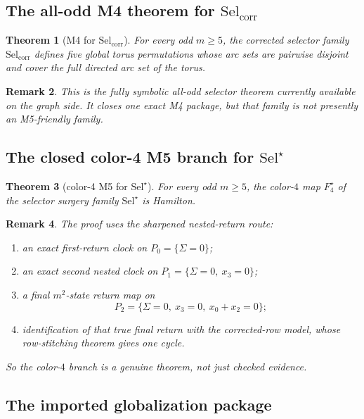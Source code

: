\documentclass[11pt]{article}
\newtheorem{theorem}{Theorem}[section]
\newtheorem{remark}[theorem]{Remark}
\newcommand{\SelCorr}{\mathrm{Sel}_{\mathrm{corr}}}
\newcommand{\SelStar}{\mathrm{Sel}^{\star}}
\begin{document}
\subsection{The all-odd M4 theorem for $\SelCorr$}

\begin{theorem}[M4 for $\SelCorr$]
\label{thm:M4-SelCorr}
For every odd $m\ge 5$, the corrected selector family $\SelCorr$ defines five
global torus permutations whose arc sets are pairwise disjoint and cover the
full directed arc set of the torus.
\end{theorem}

\begin{remark}
This is the fully symbolic all-odd selector theorem currently available on the
graph side. It closes one exact M4 package, but that family is not presently
an M5-friendly family.
\end{remark}

\subsection{The closed color-4 M5 branch for $\SelStar$}

\begin{theorem}[color-4 M5 for $\SelStar$]
\label{thm:M5-color4-SelStar}
For every odd $m\ge 5$, the color-$4$ map $F_4^{\star}$ of the selector surgery
family $\SelStar$ is Hamilton.
\end{theorem}

\begin{remark}
The proof uses the sharpened nested-return route:
\begin{enumerate}[label=\textup{(\arabic*)},leftmargin=2.5em]
\item an exact first-return clock on $P_0=\{\Sigma=0\}$;
\item an exact second nested clock on $P_1=\{\Sigma=0,\ x_3=0\}$;
\item a final $m^2$-state return map on
      \[
      P_2=\{\Sigma=0,\ x_3=0,\ x_0+x_2=0\};
      \]
\item identification of that true final return with the corrected-row model,
      whose row-stitching theorem gives one cycle.
\end{enumerate}
So the color-$4$ branch is a genuine theorem, not just checked evidence.
\end{remark}

\subsection{The imported globalization package}
\end{document}

